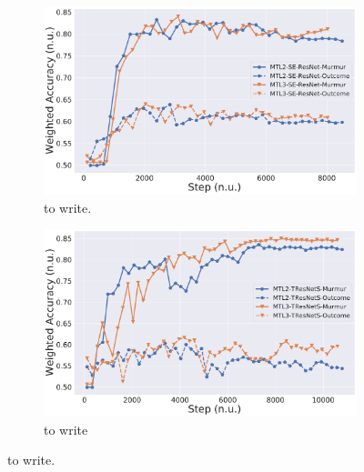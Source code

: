 
\begin{figure}
\centering
\begin{subfigure}[b]{0.49\linewidth}
    \centering
    \includegraphics[width=\textwidth]{images/se-resnet-clf-vs-mtl.pdf}
    \caption[]
    {to write.}
    \label{fig:se-resnet-clf-vs-mtl}
\end{subfigure}
\hfill
\begin{subfigure}[b]{0.49\linewidth}
    \centering
    \includegraphics[width=\textwidth]{images/tresnets-clf-vs-mtl.pdf}
    \caption[]
    {to write}
    \label{fig:tresnets-clf-vs-mtl}
\end{subfigure}
\caption[]
{to write.}
\label{fig:mtl_comparison}
\end{figure}
